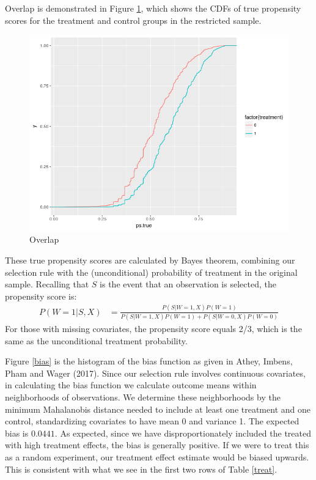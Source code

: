 \documentclass[paper=letter, fontsize=11pt]{scrartcl} %
\begin{document}
Overlap is demonstrated in Figure \ref{overlap}, which shows the CDFs of true propensity scores for the treatment and control groups in the restricted sample.

\begin{figure}[!ht]
\center
\caption{Overlap  \label{overlap}}
\includegraphics[scale=0.8]{overlap.png}
\end{figure}

These true propensity scores are calculated by Bayes theorem, combining our selection rule with the (unconditional) probability of treatment in the original sample. Recalling that $S$ is the event that an observation is selected, the propensity score is:
\begin{align*}
P(W=1|S,X) &= \frac{P(S|W=1,X)P(W=1) }{P(S|W=1,X)P(W=1) + P(S|W=0,X)P(W=0)}
\end{align*}
For those with missing covariates, the propensity score equals 2/3, which is the same as the unconditional treatment probability.

Figure \ref{bias} is the histogram of the bias function as given in Athey, Imbens, Pham and Wager (2017). Since our selection rule involves continuous covariates, in calculating the bias function we calculate outcome means within neighborhoods of observations. We determine these neighborhoods by the minimum Mahalanobis distance needed to include at least one treatment and one control, standardizing covariates to have mean 0 and variance 1. The expected bias is $0.0441$. As expected, since we have disproportionately included the treated with high treatment effects, the bias is generally positive. If we were to treat this as a random experiment, our treatment effect estimate would be biased upwards. This is consistent with what we see in the first two rows of Table \ref{treat}.
\end{document}
